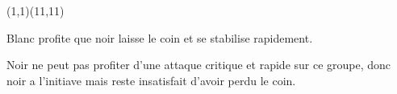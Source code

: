 \documentclass[preview, border=0pt, varwidth=false]{standalone}
\begin{document}
	\setgounit{0.6cm} 
	
\parbox[c][14.65cm][c]{10.2cm}{
	\centering
	
	\begin{psgopartialboard}{(1,1)(11,11)}
		\pass*
		\pass
	\end{psgopartialboard}
	
	\vspace{1em}	
Blanc profite que noir laisse le coin et se stabilise rapidement. 

\bigskip

Noir ne peut pas profiter d'une attaque critique et rapide sur ce groupe, donc noir a l'initiave mais reste insatisfait d'avoir perdu le coin.}
\end{document}
